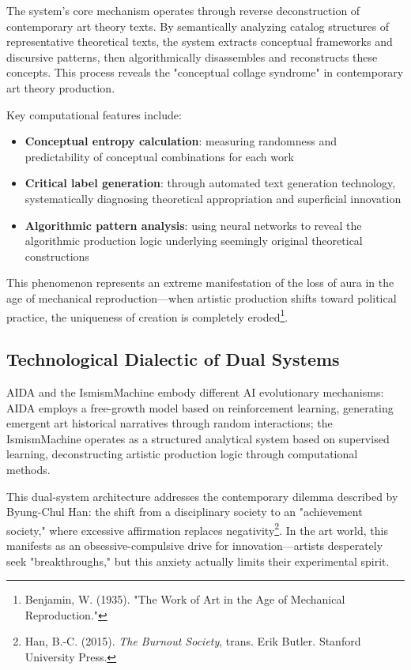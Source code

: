 \documentclass{article}
\begin{document}
The system's core mechanism operates through reverse deconstruction of contemporary art theory texts. By semantically analyzing catalog structures of representative theoretical texts, the system extracts conceptual frameworks and discursive patterns, then algorithmically disassembles and reconstructs these concepts. This process reveals the "conceptual collage syndrome" in contemporary art theory production.

Key computational features include:

\begin{itemize}
\item \textbf{Conceptual entropy calculation}: measuring randomness and predictability of conceptual combinations for each work
\item \textbf{Critical label generation}: through automated text generation technology, systematically diagnosing theoretical appropriation and superficial innovation
\item \textbf{Algorithmic pattern analysis}: using neural networks to reveal the algorithmic production logic underlying seemingly original theoretical constructions
\end{itemize}

This phenomenon represents an extreme manifestation of the loss of aura in the age of mechanical reproduction—when artistic production shifts toward political practice, the uniqueness of creation is completely eroded\footnote{Benjamin, W. (1935). "The Work of Art in the Age of Mechanical Reproduction."}.

\subsection{Technological Dialectic of Dual Systems}

AIDA and the IsmismMachine embody different AI evolutionary mechanisms: AIDA employs a free-growth model based on reinforcement learning, generating emergent art historical narratives through random interactions; the IsmismMachine operates as a structured analytical system based on supervised learning, deconstructing artistic production logic through computational methods.

This dual-system architecture addresses the contemporary dilemma described by Byung-Chul Han: the shift from a disciplinary society to an "achievement society," where excessive affirmation replaces negativity\footnote{Han, B.-C. (2015). \textit{The Burnout Society}, trans. Erik Butler. Stanford University Press.}. In the art world, this manifests as an obsessive-compulsive drive for innovation—artists desperately seek "breakthroughs," but this anxiety actually limits their experimental spirit.
\end{document}
